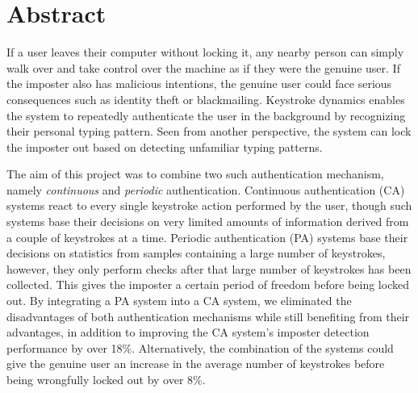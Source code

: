 \chapter*{Abstract}
If a user leaves their computer without locking it, any nearby person can simply walk over and take control over the machine as if they were the genuine user.
If the imposter also has malicious intentions, the genuine user could face serious consequences such as identity theft or blackmailing.
Keystroke dynamics enables the system to repeatedly authenticate the user in the background by recognizing their personal typing pattern.
Seen from another perspective, the system can lock the imposter out based on detecting unfamiliar typing patterns.

The aim of this project was to combine two such authentication mechanism, namely \textit{continuous} and \textit{periodic} authentication. 
Continuous authentication (CA) systems react to every single keystroke action performed by the user, though such systems base their decisions on very limited amounts of information derived from a couple of keystrokes at a time.
Periodic authentication (PA) systems base their decisions on statistics from samples containing a large number of keystrokes, however, they only perform checks after that large number of keystrokes has been collected.
This gives the imposter a certain period of freedom before being locked out.
By integrating a PA system into a CA system, we eliminated the disadvantages of both authentication mechanisms while still benefiting from their advantages, in addition to improving the CA system's imposter detection performance by over 18\%.
Alternatively, the combination of the systems could give the genuine user an increase in the average number of keystrokes before being wrongfully locked out by over 8\%.
\hypersetup{pageanchor=false}